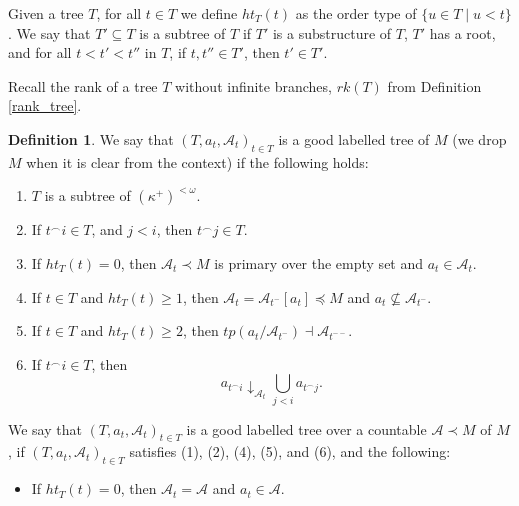 \documentclass[12pt,a4paper]{amsart}
\theoremstyle{definition}
\newtheorem{defn}[thm]{Definition}
\theoremstyle{remark}
\renewcommand{\mid}{\mathrel{|}\allowbreak}
\begin{document}
Given a tree $T$, for all $t\in T$ we define $ht_T(t)$ as the order type of $\{u\in T\mid u< t\}$.
 We say that $T'\subseteq T$ is a subtree of $T$ if $T'$ is a substructure of $T$, $T'$ has a root, and for all $t<t'<t''$ in $T$, if $t,t''\in T'$, then $t'\in T'$. 

 Recall the rank of a tree $T$ without infinite branches, $rk(T)$ from Definition \ref{rank_tree}.

\begin{defn}\label{good_labelled_tree_empt}
    We say that $(T,a_t,\mathcal{A}_t)_{t\in T}$ is a good labelled tree of $M$ (we drop $M$ when it is clear from the context) if the following holds:
    \begin{enumerate}
        \item $T$ is a subtree of $(\kappa^+)^{<\omega}$.
        \item If $t^\frown i\in T$, and $j<i$, then $t^\frown j\in T$.
        \item If $ht_T(t)=0$, then $\mathcal{A}_{t}\prec M$ is primary over the empty set and $a_t\in\mathcal{A}_{t}$.
        \item If $t\in T$ and $ht_T(t)\ge 1$, then $\mathcal{A}_t =\mathcal{A}_{t^-}[a_t]\preceq M$ and $a_t\not \subseteq\mathcal{A}_{t^-}$.
        \item If $t\in T$ and $ht_T(t)\ge 2$, then $tp(a_t / \mathcal{A}_{t^-})\dashv \mathcal{A}_{t^{--}}$.
        \item If $t^\frown i\in T$, then $$a_{t^\frown i}\downarrow_{\mathcal{A}_t} \bigcup_{j<i}a_{t^\frown j}.$$
    \end{enumerate}
    We say that $(T,a_t,\mathcal{A}_t)_{t\in T}$ is a good labelled tree over a countable $\mathcal{A}\prec M$ of $M$, if $(T,a_t,\mathcal{A}_t)_{t\in T}$ satisfies (1), (2), (4), (5), and (6), and the following:
\begin{itemize}
    \item [($3'$)] If $ht_T(t)=0$, then $\mathcal{A}_{t}=\mathcal{A}$ and $a_t\in \mathcal{A}$.
\end{itemize}
\end{defn}
\end{document}
